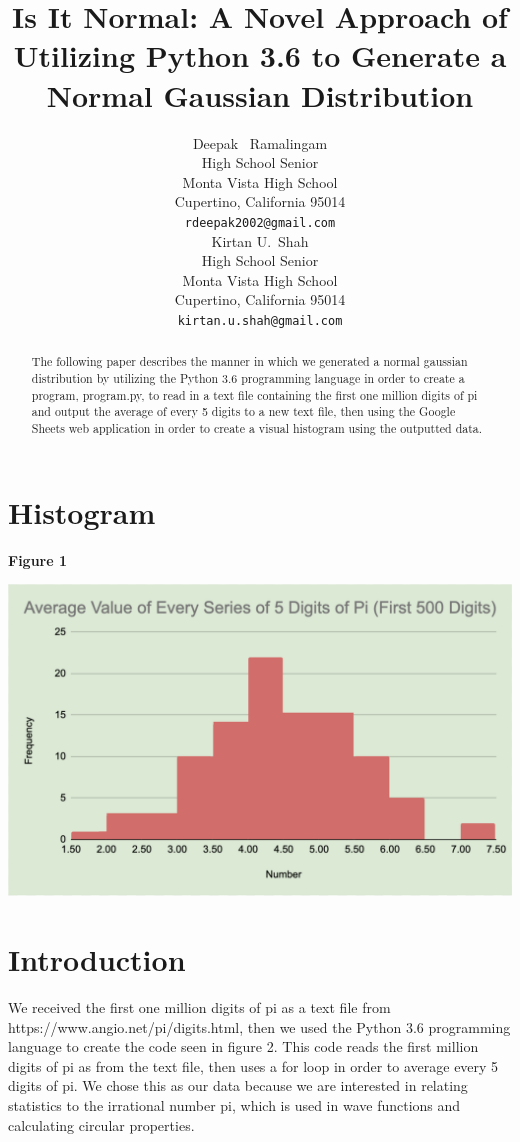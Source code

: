 \documentclass{article}
\title{Is It Normal: A Novel Approach of Utilizing Python 3.6 to Generate a Normal Gaussian Distribution}
\author{
  Deepak ~Ramalingam \\
  High School Senior \\
  Monta Vista High School\\
  Cupertino, California 95014 \\
  \texttt{rdeepak2002@gmail.com} \\
   \And
 Kirtan U.~Shah \\
  High School Senior\\
  Monta Vista High School\\
  Cupertino, California 95014 \\
  \texttt{kirtan.u.shah@gmail.com} \\
}
\begin{document}
\maketitle
 
\begin{abstract}
The following paper describes the manner in which we generated a normal gaussian distribution by utilizing the Python 3.6 programming language in order to create a program, program.py, to read in a text file containing the first one million digits of pi and output the average of every 5 digits to a new text file, then using the Google Sheets web application in order to create a visual histogram using the outputted data.
\end{abstract}
 
\section{Histogram}
 
\centerline{\textbf{Figure 1}}
 
\includegraphics[width=\textwidth]{histogram.png}
 
\section{Introduction}
We received the first one million digits of pi as a text file from https://www.angio.net/pi/digits.html, then we used the Python 3.6 programming language to create the code seen in figure 2. This code reads the first million digits of pi as from the text file, then uses a for loop in order to average every 5 digits of pi. We chose this as our data because we are interested in relating statistics to the irrational number pi, which is used in wave functions and calculating circular properties.
 
\end{document}
